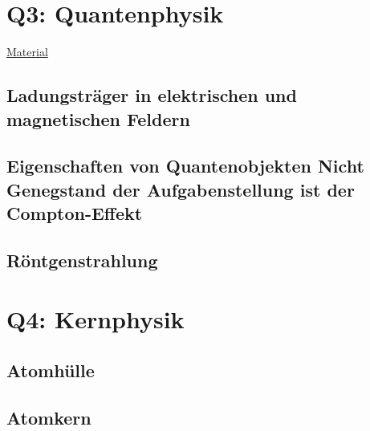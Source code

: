 \documentclass{article}
\begin{document}
    \section{Q3: Quantenphysik}

    \href{https://gcm.schule/material/2022/physik/lk13/}{Material}
    
    	\subsection{Ladungsträger in elektrischen und magnetischen Feldern}
    	
    	\subsection{Eigenschaften von Quantenobjekten Nicht Genegstand der Aufgabenstellung ist der Compton-Effekt}
    	
    	\subsection{Röntgenstrahlung}

    \section{Q4: Kernphysik}
    
    	\subsection{Atomhülle}
    	
    	\subsection{Atomkern}
    	
\end{document}
